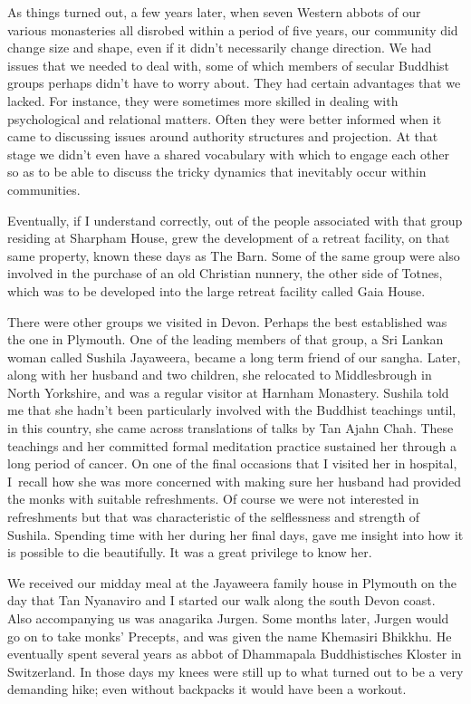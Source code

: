 As things turned out, a few years later, when seven Western abbots of
our various monasteries all disrobed within a period of five years, our
community did change size and shape, even if it didn't necessarily
change direction. We had issues that we needed to deal with, some of
which members of secular Buddhist groups perhaps didn't have to worry
about. They had certain advantages that we lacked. For instance, they
were sometimes more skilled in dealing with psychological and relational
matters. Often they were better informed when it came to discussing
issues around authority structures and projection. At that stage we
didn't even have a shared vocabulary with which to engage each other so
as to be able to discuss the tricky dynamics that inevitably occur
within communities.

Eventually, if I understand correctly, out of the people associated with
that group residing at Sharpham House, grew the development of a retreat
facility, on that same property, known these days as The Barn\cite{barn}.
Some of the same group were also involved in the
purchase of an old Christian nunnery, the other side of Totnes, which
was to be developed into the large retreat facility called Gaia House\cite{gaia}.

There were other groups we visited in Devon. Perhaps the best
established was the one in Plymouth. One of the leading members of that
group, a Sri Lankan woman called Sushila Jayaweera, became a long term
friend of our sangha. Later, along with her husband and two children,
she relocated to Middlesbrough in North Yorkshire, and was a regular
visitor at Harnham Monastery. Sushila told me that she hadn't been
particularly involved with the Buddhist teachings until, in this
country, she came across translations of talks by Tan Ajahn Chah. These
teachings and her committed formal meditation practice sustained her
through a long period of cancer. On one of the final occasions that I visited
her in hospital, I~recall how she was more concerned with making sure
her husband had provided the monks with suitable refreshments. Of course
we were not interested in refreshments but that was characteristic of
the selflessness and strength of Sushila. Spending time with her during
her final days, gave me insight into how it is possible to die
beautifully. It was a great privilege to know her.

We received our midday meal at the Jayaweera family house in Plymouth on
the day that Tan Nyanaviro and I started our walk along the south Devon
coast. Also accompanying us was anagarika Jurgen. Some months later,
Jurgen would go on to take monks' Precepts, and was given the name
Khemasiri Bhikkhu. He eventually spent several years as abbot of
Dhammapala Buddhistisches Kloster\cite{dhammapala}
in Switzerland. In those days my knees were still up
to what turned out to be a very demanding hike; even without backpacks
it would have been a workout.

